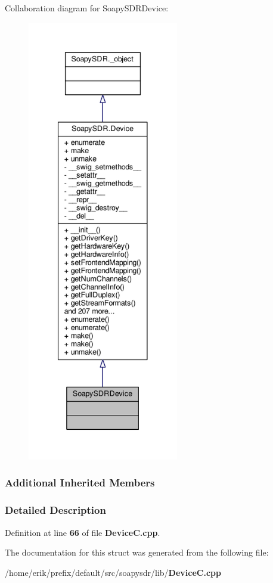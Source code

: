 Collaboration diagram for Soapy\+S\+D\+R\+Device\+:
\nopagebreak
\begin{figure}[H]
\begin{center}
\leavevmode
\includegraphics[height=550pt]{d3/d69/structSoapySDRDevice__coll__graph}
\end{center}
\end{figure}
\subsubsection*{Additional Inherited Members}


\subsubsection{Detailed Description}


Definition at line {\bf 66} of file {\bf Device\+C.\+cpp}.



The documentation for this struct was generated from the following file\+:\begin{DoxyCompactItemize}
\item 
/home/erik/prefix/default/src/soapysdr/lib/{\bf Device\+C.\+cpp}\end{DoxyCompactItemize}
